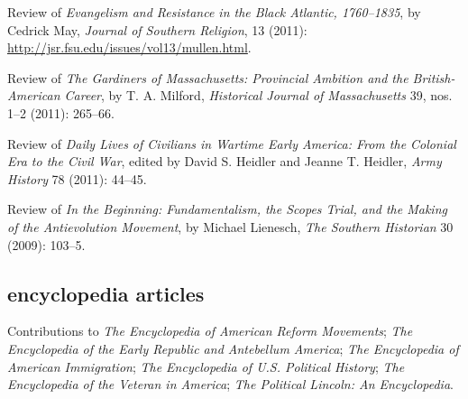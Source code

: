 \documentclass[11pt]{article}
\begin{document}
  Review of \emph{Evangelism and Resistance in the Black Atlantic,
    1760--1835}, by Cedrick May, \emph{Journal of Southern Religion}, 13
  (2011): \url{http://jsr.fsu.edu/issues/vol13/mullen.html}.

  Review of \emph{The Gardiners of Massachusetts: Provincial Ambition and
    the British-American Career}, by T. A. Milford, \emph{Historical Journal of
    Massachusetts} 39, nos. 1--2 (2011): 265--66.

  Review of \emph{Daily Lives of Civilians in Wartime Early America: From
    the Colonial Era to the Civil War}, edited by David S. Heidler and
  Jeanne T. Heidler, \emph{Army History} 78 (2011): 44--45.

  Review of \emph{In the Beginning: Fundamentalism, the Scopes Trial, and
    the Making of the Antievolution Movement}, by Michael Lienesch,
  \emph{The Southern Historian} 30 (2009): 103--5.

  \subsection{encyclopedia articles}

  Contributions to \emph{The Encyclopedia of American Reform Movements}; 
  \emph{The Encyclopedia of the Early Republic and Antebellum America};
  \emph{The Encyclopedia of American Immigration}; \emph{The Encyclopedia of 
    U.S. Political History}; \emph{The Encyclopedia of the Veteran in 
    America}; \emph{The Political Lincoln: An Encyclopedia}.





\end{document}
